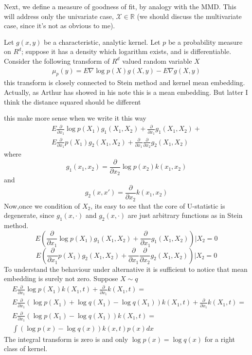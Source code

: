 \documentclass{article}
\begin{document}
Next, we define a measure of goodness of fit, by analogy with the
MMD. This will address only the univariate case, $\mathcal{X}\in\mathbb{R}$
(we should discuss the multivariate case, since it's not as obvious
to me).




Let $g(x,y)$ be a characteristic, analytic kernel. Let $p$ be a probability measure on $R^d$; suppose it has a density which logarithm exists, and is differentiable. Consider the following transform of $R^d$ valued random variable $X$
\begin{align}
 \mu_p(y) = E  \nabla \log p(X) g(X,y) - E \nabla g(X,y)
\end{align}
this transform is closely connected to Stein method and kernel mean embedding. Actually, as Arthur has showed in his note this is a mean embedding. But latter I think the distance squared should be different

this make more sense when we write it this way
\begin{align}
 E \frac{\partial } {\partial x_1} \log p(X_1) g_1(X_1,X_2) + \frac{\partial } {\partial x_1} g_1(X_1,X_2) + \\
 E \frac{\partial } {\partial x_1} p(X_1) g_2(X_1,X_2) +  \frac{\partial } {\partial x_1}\frac{\partial } {\partial x_2} g_2(X_1,X_2)
\end{align}
where 
$$
g_1(x_1,x_2) = \frac{\partial } {\partial x_2} \log p(x_2) k(x_1,x_2)
$$
and
$$
g_2(x,x') = \frac{\partial } {\partial x_2} k(x_1,x_2)
$$
Now,once we condition of $X_2$,  its easy to see that the core of U-statistic is degenerate, since $g_1(x,\cdot)$ and $g_2(x,\cdot)$ are just arbitrary functions as in Stein method.  
$$
E \left (\frac{\partial } {\partial x_1} \log p(X_1) g_1(X_1,X_2) + \frac{\partial } {\partial x_1} g_1(X_1,X_2) \right )| X_2 = 0
$$
$$
E \left ( \frac{\partial } {\partial x_1} p(X_1) g_2(X_1,X_2) 
+  \frac{\partial } {\partial x_1}\frac{\partial } {\partial x_2} g_2(X_1,X_2) \right )| X_2 = 0
$$
To understand the behaviour under alternative it is sufficient to notice that mean embedding is surely not zero. Suppose $X \sim q$
\begin{align}
 &E \frac{\partial } {\partial x_1} \log p(X_1) k(X_1,t) + \frac{\partial } {\partial x_1} k(X_1,t) =\\
 &E  \frac{\partial } {\partial x_1} ( \log  p(X_1) + \log  q(X_1)- \log  q(X_1)  )  k(X_1,t)   + \frac{\partial } {\partial x_1} k(X_1,t) = \\
 &E  \frac{\partial } {\partial x_1} (\log p(X_1) - \log q(X_1))k(X_1,t)   = \\
 & \int  (\log p(x) - \log q(x) ) k(x,t) p(x) dx
\end{align}
The integral transform is zero is and only $\log p(x) = \log q(x)$ for a right class of kernel.
\end{document}
